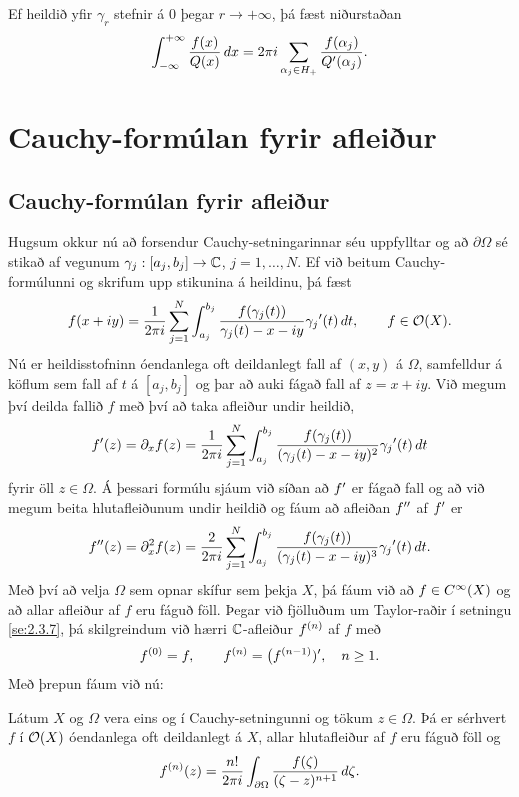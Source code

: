 
\noindent
Ef heildið yfir ${\gamma}_r$ stefnir á $0$ þegar $r\to+{\infty}$,  
þá fæst niðurstaðan
 $$\int_{-\infty}\sp {+\infty} \dfrac {f(x)}{Q(x)}\, dx=
2\pi i\sum_{\alpha_j\in H_+} \dfrac{f(\alpha_j)}{Q{\sp{\prime}}(\alpha_j)}.
 $$

\section{Cauchy-formúlan fyrir afleiður}



\subsection*{Cauchy-formúlan fyrir afleiður}

Hugsum okkur nú að forsendur Cauchy-setningarinnar séu uppfylltar og
að $\partial\Omega$ sé stikað af vegunum
$\gamma_j:[a_j,b_j]\to {\mathbb C}$, $j=1,\dots,N$.  Ef við beitum
Cauchy-formúlunni og skrifum upp stikunina á heildinu, þá fæst
 $$f(x+iy)=\dfrac 1{2\pi i}\sum_{j=1}\sp N \int_{a_j}\sp {b_j}
\dfrac {f(\gamma_j(t))}{\gamma_j(t)-x-iy}\gamma_j{\sp{\prime}}(t)\, dt, 
\qquad f\in {\cal O}(X).
 $$
Nú er heildisstofninn óendanlega oft deildanlegt fall af $(x,y)$ á
$\Omega$, samfelldur á köflum sem fall af $t$ á $[a_j,b_j]$ og þar að
auki fágað fall af $z=x+iy$.  Við
megum því deilda fallið $f$ með því að taka afleiður undir heildið,
 \begin{equation*}f{\sp{\prime}}(z)=\partial_xf(z)=
\dfrac 1{2\pi i}\sum_{j=1}\sp N \int_{a_j}\sp {b_j}
\dfrac {f(\gamma_j(t))}{(\gamma_j(t)-x-iy)\sp 2}\gamma_j{\sp{\prime}}(t)\, dt
\label{10.3.1}
 \end{equation*}
fyrir öll $z\in \Omega$.  {Á} þessari formúlu sjáum við síðan að
$f{\sp{\prime}}$ er fágað fall og að við megum beita hlutafleiðunum undir
heildið og fáum að afleiðan $f{\sp{\prime\prime}}$ af $f{\sp{\prime}}$ er
 \begin{equation*}f{\sp{\prime\prime}}(z)=\partial_x\sp 2f(z)=
\dfrac 2{2\pi i}\sum_{j=1}\sp N \int_{a_j}\sp {b_j}
\dfrac {f(\gamma_j(t))}{(\gamma_j(t)-x-iy)\sp 3}\gamma_j{\sp{\prime}}(t)\, dt.
\label{10.3.2}
 \end{equation*}
Með því að velja $\Omega$ sem opnar skífur sem þekja $X$, þá fáum við
að $f\in C\sp{\infty}(X)$ og að allar afleiður af $f$ eru fáguð
föll.  Þegar við fjölluðum um Taylor-raðir í setningu
\ref{se:2.3.7}, þá skilgreindum við  hærri ${\mathbb C}$-afleiður $f\sp{(n)}$ af $f$ með
 $$f\sp{(0)}=f, \qquad f\sp{(n)}=\big(f\sp{(n-1)}){\sp{\prime}}, \quad n\geq 1.
 $$
Með þrepun fáum við nú:
\begin{se}\label{set10.3.1}  
Látum $X$ og $\Omega$ vera eins og í Cauchy-setningunni
og tökum $z\in \Omega$.  Þá er sérhvert $f$ í ${\cal O}(X)$
óendanlega oft deildanlegt á $X$, allar hlutafleiður af $f$ eru
fáguð föll og
 \begin{equation*}f\sp{(n)}(z)=
\dfrac {n!}{2\pi i}\int_{\partial\Omega}
\dfrac {f(\zeta)}{(\zeta-z)\sp {n+1}}\, d\zeta.
\label{10.3.3}
 \end{equation*}
\end{se}


